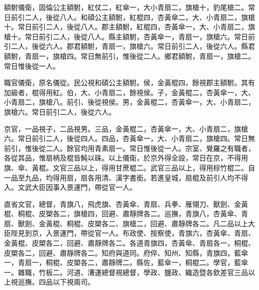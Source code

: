 \begin{pinyinscope}
額駙儀衛，固倫公主額駙，紅仗二，紅傘一，大小青扇二，旗槍十，豹尾槍二。常日前引二人，後從八人。和碩公主額駙，紅棍四，杏黃傘二，大、小青扇二，旗槍十。常日前引二人，後從八人。郡主額駙，紅棍四，杏黃傘一，大、小青扇二，旗槍十。常日前引二人，後從八人。縣主額駙，杏黃傘一，青扇一，旗槍六。常日前引二人，後從六人。郡君額駙，青扇一，旗槍六。常日前引二人，後從六人。縣君額駙，青扇一，旗槍四。常日無前引，惟後從二人。鄉君額駙，青扇一，旗槍二。常日惟後從一人。

職官儀衛，原名儀從。民公視和碩公主額駙。侯，金黃棍四，餘視郡主額駙。其有加級者，棍得用紅。伯，大、小青扇二，餘視侯。子，金黃棍二，杏黃傘一，大、小青扇二，旗槍八。前引、後從視侯。男，金黃棍二，杏黃傘一，大、小青扇二，旗槍六。常日前引二人，後從六人。

京官，一品視子，二品視男。三品，金黃棍二，杏黃傘一，大、小青扇二，旗槍六。常日前引二人，後從四人。四品，杏黃傘一，大、小青扇二，旗槍四。常日無前引，惟後從二人。餘官均用青素扇一。常日惟後從一人。宗室、覺羅之有職者，各從其品，惟扇柄及棍皆魨以硃。以上儀衛，於京外得全設，常日在京，不得用旗、傘、黃棍。文官三品以上，得用甘蔗棍二。武官三品以上，得用棕竹棍二。自一品至九品，均得用扇，扇各用清、漢字書銜。若進皇城，扇棍及前引人均不得入。文武大臣因事入景運門，帶從官一人。

直省文官，總督，青旗八，飛虎旗、杏黃傘、青扇、兵拳、雁翎刀、獸劍、金黃棍、桐棍、皮槊各二，旗槍四，回避、肅靜牌各二。巡撫，青旗八，杏黃傘、青扇、獸劍、金黃棍、桐棍、皮槊各二、旗槍二，回避、肅靜牌各二。凡二品以上大臣陛見到京，入景運門，帶從官一人。布政使、按察使，青旗六，杏黃傘、青扇、金黃棍、皮槊各二，回避、肅靜牌各二。各道青旗四，杏黃傘、青扇各一，桐棍、皮槊各二，回避、肅靜牌各二。知府與道同。府倅、知州、知縣，青旗四，藍傘一，青扇一，桐棍、皮槊各二，肅靜牌二。縣佐，藍傘一，桐棍二。學官，藍傘一。雜職，竹板二。河道、漕運總督視總督，學政、鹽政、織造暨各欽差官三品以上視巡撫。四品以下視兩司。


\end{pinyinscope}
